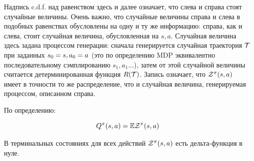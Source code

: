 Надпись c.d.f. над равенством здесь и далее означает, что слева и справа стоят случайные величины. Очень важно, что случайные величины справа и слева в подобных равенствах обусловлены на одну и ту же информацию: справа, как и слева, стоит случайная величина, обусловленная на $s, a$. Случайная величина здесь задана процессом генерации: сначала генерируется случайная траектория $\mathcal{T}$ при заданных $s_0 \HM= s, a_0 \HM= a$ (это по определению MDP эквивалентно последовательному сэмплированию $s_1, a_1 \dots$), затем от этой случайной величины считается детерминированная функция $R(\mathcal{T})$. Запись означает, что $\mathcal{Z}^\pi(s, a)$ имеет в точности то же распределение, что и случайная величина, генерируемая процессом, описанном справа.

По определению:

\begin{proposition}
\begin{equation}\label{QZ}
Q^\pi(s, a) = \mathbb{E} \mathcal{Z}^\pi(s, a)
\end{equation}
\end{proposition}

\begin{proposition}
В терминальных состояниях для всех действий $\mathcal{Z}^{\pi}(s, a)$ есть дельта-функция в нуле.
\end{proposition}

